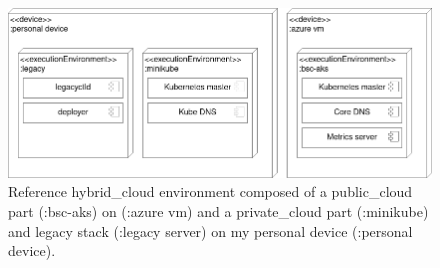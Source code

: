 \documentclass[../main.tex]{subfiles}
\begin{document}
    \begin{figure}[h]
        \centering
        \includegraphics[width=.9\linewidth]{img/impl_env_setup_simple_v2.png}
        \captionsetup{justification=centering}
        \caption{
            Reference \gls{hybrid_cloud} environment composed of a \gls{public_cloud} part (:bsc-aks) on  (:azure vm) and a \gls{private_cloud} part (:minikube) and legacy stack (:legacy server) on my personal device (:personal device).
        }
        \label{fig:env_simple}
    \end{figure}
\end{document}
